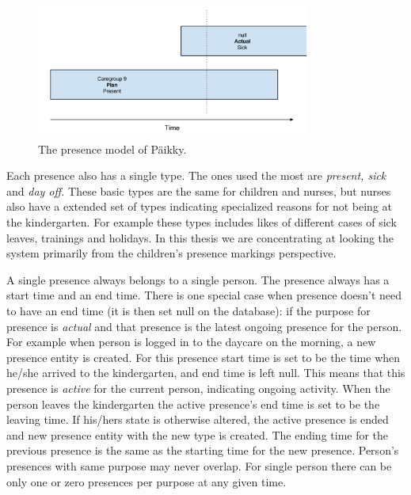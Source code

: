 \begin{figure}[t]
\begin{center}
\includegraphics[width=0.8\textwidth]{assets/presencemodel.png}
\end{center}
\caption{The presence model of Päikky.}
\label{fig:presencemodel}
\end{figure}



Each presence also has a single type. The ones used the most are \textit{present, sick} and \textit{day off.} These basic types are the same for children and nurses, but nurses also have a extended set of types indicating specialized reasons for not being at the kindergarten. For example these types includes likes of different cases of sick leaves, trainings and holidays. In this thesis we are concentrating at looking the system primarily from the children's presence markings perspective.

A single presence always belongs to a single person. The presence always has a start time and an end time. There is one special case when presence doesn't need to have an end time (it is then set null on the database): if the purpose for presence is \textit{actual} and that presence is the latest ongoing presence for the person. For example when person is logged in to the daycare on the morning, a new presence entity is created. For this presence start time is set to be the time when he/she arrived to the kindergarten, and end time is left null. This means that this presence is \textit{active} for the current person, indicating ongoing activity. When the person leaves the kindergarten the active presence's end time is set to be the leaving time. If his/hers state is otherwise altered, the active presence is ended and new presence entity with the new type is created. The ending time for the previous presence is the same as the starting time for the new presence. Person's presences with same purpose may never overlap. For single person there can be only one or zero presences per purpose at any given time.



